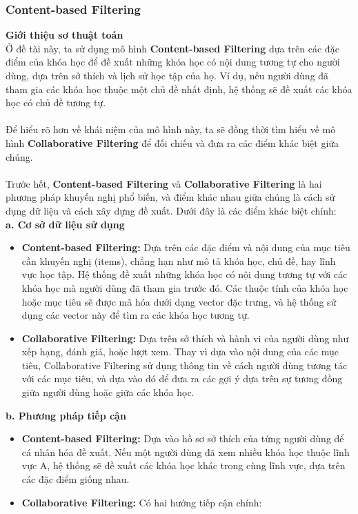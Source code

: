 \subsubsection{Content-based Filtering}
\textbf{Giới thiệu sơ thuật toán}\\
Ở đề tài này, ta sử dụng mô hình \textbf{Content-based Filtering} dựa trên các đặc điểm của khóa học để đề xuất những khóa học có nội dung tương tự cho người dùng, dựa trên sở thích và lịch sử học tập của họ. Ví dụ, nếu người dùng đã tham gia các khóa học thuộc một chủ đề nhất định, hệ thống sẽ đề xuất các khóa học có chủ đề tương tự.\\
\\
Để hiểu rõ hơn về khái niệm của mô hình này, ta sẽ đồng thời tìm hiểu về mô hình \textbf{Collaborative Filtering} để đối chiếu và đưa ra các điểm khác biệt giữa chúng.\\
\\
Trước hết,  \textbf{Content-based Filtering} và \textbf{Collaborative Filtering} là hai phương pháp khuyến nghị phổ biến, và điểm khác nhau giữa chúng là cách sử dụng dữ liệu và cách xây dựng đề xuất. Dưới đây là các điểm khác biệt chính:\\
\textbf{a. Cơ sở dữ liệu sử dụng}
\begin{itemize}
    \item \textbf{Content-based Filtering:} Dựa trên các đặc điểm và nội dung của mục tiêu cần khuyến nghị (items), chẳng hạn như mô tả khóa học, chủ đề, hay lĩnh vực học tập. Hệ thống đề xuất những khóa học có nội dung tương tự với các khóa học mà người dùng đã tham gia trước đó. Các thuộc tính của khóa học hoặc mục tiêu sẽ được mã hóa dưới dạng vector đặc trưng, và hệ thống sử dụng các vector này để tìm ra các khóa học tương tự.
    \item \textbf{Collaborative Filtering:} Dựa trên sở thích và hành vi của người dùng như xếp hạng, đánh giá, hoặc lượt xem. Thay vì dựa vào nội dung của các mục tiêu, Collaborative Filtering sử dụng thông tin về cách người dùng tương tác với các mục tiêu, và dựa vào đó để đưa ra các gợi ý dựa trên sự tương đồng giữa người dùng hoặc giữa các khóa học.
\end{itemize}
\textbf{b. Phương pháp tiếp cận}
\begin{itemize}
    \item \textbf{Content-based Filtering:} Dựa vào hồ sơ sở thích của từng người dùng để cá nhân hóa đề xuất. Nếu một người dùng đã xem nhiều khóa học thuộc lĩnh vực A, hệ thống sẽ đề xuất các khóa học khác trong cùng lĩnh vực, dựa trên các đặc điểm giống nhau.
    \item \textbf{Collaborative Filtering:} Có hai hướng tiếp cận chính:
\end{itemize}
